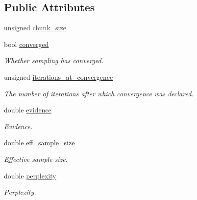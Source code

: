 \subsection*{Public Attributes}
\begin{DoxyCompactItemize}
\item 
unsigned \hyperlink{structeos_1_1PopulationMonteCarloSampler_1_1Status_aec7820c1ca91f2af381c1bb81182fa26}{chunk\_\-size}
\item 
bool \hyperlink{structeos_1_1PopulationMonteCarloSampler_1_1Status_a853d94d0b2fc16ee51f6e32ca4b0515c}{converged}
\begin{DoxyCompactList}\small\item\em Whether sampling has converged. \item\end{DoxyCompactList}\item 
unsigned \hyperlink{structeos_1_1PopulationMonteCarloSampler_1_1Status_a6b30cf9e83650e861475f2f0036c09b0}{iterations\_\-at\_\-convergence}
\begin{DoxyCompactList}\small\item\em The number of iterations after which convergence was declared. \item\end{DoxyCompactList}\item 
double \hyperlink{structeos_1_1PopulationMonteCarloSampler_1_1Status_ab762703da0930ae2182b696b85358b53}{evidence}
\begin{DoxyCompactList}\small\item\em Evidence. \item\end{DoxyCompactList}\item 
double \hyperlink{structeos_1_1PopulationMonteCarloSampler_1_1Status_a35814022e64d939f7164ece7a796c07e}{eff\_\-sample\_\-size}
\begin{DoxyCompactList}\small\item\em Effective sample size. \item\end{DoxyCompactList}\item 
double \hyperlink{structeos_1_1PopulationMonteCarloSampler_1_1Status_a468aeeb618c761543be6d6833347e296}{perplexity}
\begin{DoxyCompactList}\small\item\em Perplexity. \item\end{DoxyCompactList}\end{DoxyCompactItemize}


